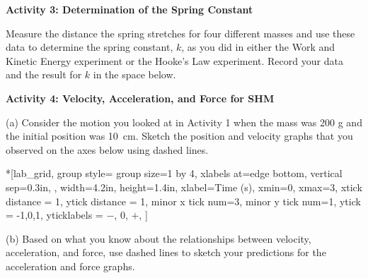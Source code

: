 %

\textbf{Activity 3: Determination of the Spring Constant }

Measure the distance the spring stretches for four different masses and use
these data to determine the spring constant, $k$, as you did in either the Work and Kinetic Energy experiment or the Hooke's Law experiment. Record your data and the result for $k$ in the space below.
\answerspace{40mm}

\pagebreak[2]
\textbf{Activity 4: Velocity, Acceleration, and Force for SHM} 

(a) Consider the motion you looked at in Activity 1 when the mass was 200 g
and the initial position was 10~cm. Sketch the position and velocity graphs
that you observed on the axes below using dashed lines.


\begin{lab_groupplot}*{}[lab_grid,
	group style={
		group size=1 by 4,
		xlabels at=edge bottom,
		vertical sep=0.3in,
		},
	width=4.2in,  height=1.4in,
	xlabel=Time (s),
	xmin=0, xmax=3,
	xtick distance = 1, 
	ytick distance = 1, 
	minor x tick num=3,
	minor y tick num=1,
	ytick = {-1,0,1},
	yticklabels = {$-$, 0, $+$},
	]
\nextgroupplot[
	ytick distance = 1, 
	minor y tick num=3,
	ymin=0,ymax=1, 
	ylabel={Position (m/s)},
	]
\nextgroupplot[
	ymin=-1,ymax=1, 
	ylabel={Velocity (m/s)},
	]
\nextgroupplot[
	ymin=-1,ymax=1, 
	ylabel={Acceleration (m/s$^2$)},
	]
\nextgroupplot[
	ymin=-1,ymax=1, 
	ylabel={Force (N)},
	]
\end{lab_groupplot}



(b) Based on what you know about the relationships between velocity, 
acceleration, and force, use dashed lines to sketch your predictions for the 
acceleration and force graphs.

